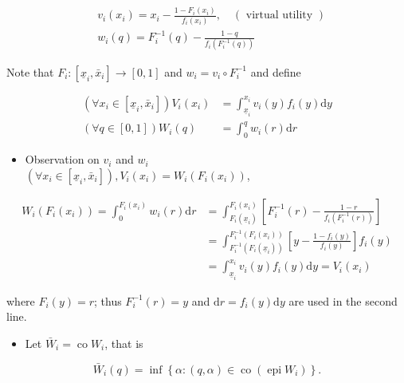 \documentclass[10pt]{article}
\begin{document}
$$
\begin{aligned}
& v_{i}\left(x_{i}\right)=x_{i}-\frac{1-F_{i}\left(x_{i}\right)}{f_{i}\left(x_{i}\right)}, \quad(\text { virtual utility }) \\
& w_{i}(q)=F_{i}^{-1}(q)-\frac{1-q}{f_{i}\left(F_{i}^{-1}(q)\right)}
\end{aligned}
$$

Note that $F_{i}:\left[\underline{x}_{i}, \bar{x}_{i}\right] \rightarrow[0,1]$ and $w_{i}=v_{i} \circ F_{i}^{-1}$ and define

$$
\begin{aligned}
\left(\forall x_{i} \in\left[\underline{x}_{i}, \bar{x}_{i}\right]\right) V_{i}\left(x_{i}\right) & =\int_{\underline{x}_{i}}^{x_{i}} v_{i}(y) f_{i}(y) \mathrm{d} y \\
(\forall q \in[0,1]) W_{i}(q) & =\int_{0}^{q} w_{i}(r) \mathrm{d} r
\end{aligned}
$$

\begin{itemize}
  \item Observation on $v_{i}$ and $w_{i}$\\
$\left(\forall x_{i} \in\left[\underline{x}_{i}, \bar{x}_{i}\right]\right), V_{i}\left(x_{i}\right)=W_{i}\left(F_{i}\left(x_{i}\right)\right)$,
\end{itemize}

$$
\begin{aligned}
W_{i}\left(F_{i}\left(x_{i}\right)\right)=\int_{0}^{F_{i}\left(x_{i}\right)} w_{i}(r) \mathrm{d} r & =\int_{F_{i}\left(\underline{x}_{i}\right)}^{F_{i}\left(x_{i}\right)}\left[F_{i}^{-1}(r)-\frac{1-r}{f_{i}\left(F_{i}^{-1}(r)\right)}\right] \\
& =\int_{F_{i}^{-1}\left(F_{i}\left(\underline{x}_{i}\right)\right)}^{F_{i}^{-1}\left(F_{i}\left(x_{i}\right)\right)}\left[y-\frac{1-f_{i}(y)}{f_{i}(y)}\right] f_{i}(y) \\
& =\int_{\underline{x}_{i}}^{x_{i}} v_{i}(y) f_{i}(y) \mathrm{d} y=V_{i}\left(x_{i}\right)
\end{aligned}
$$

where $F_{i}(y)=r$; thus $F_{i}^{-1}(r)=y$ and $\mathrm{d} r=f_{i}(y) \mathrm{d} y$ are used in the second line.

\begin{itemize}
  \item Let $\bar{W}_{i}=\operatorname{co} W_{i}$, that is
\end{itemize}

$$
\bar{W}_{i}(q)=\inf \left\{\alpha:(q, \alpha) \in \operatorname{co}\left(\operatorname{epi} W_{i}\right)\right\} .
$$
\end{document}
